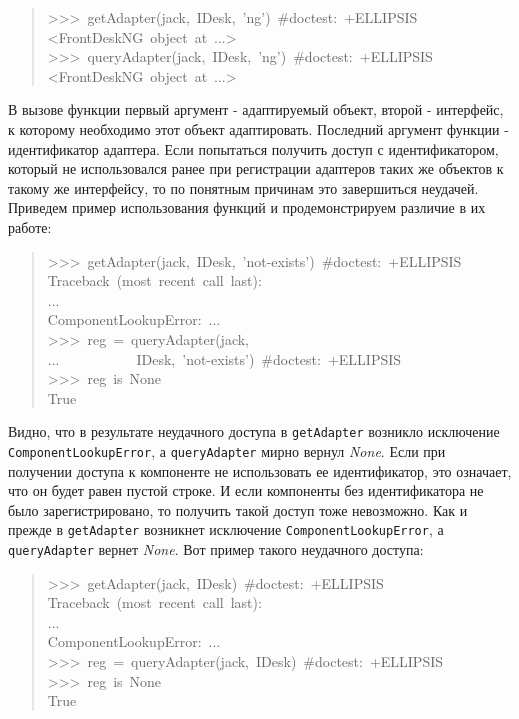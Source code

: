 \documentclass[a4paper,openany,twoside,final]{book}
\providecommand*{\DUroletitlereference}[1]{\textsl{#1}}
\begin{document}
\begin{quote}{\ttfamily \raggedright \noindent
>{}>{}>~getAdapter(jack,~IDesk,~'ng')~\#doctest:~+ELLIPSIS\\
<FrontDeskNG~object~at~...>\\
>{}>{}>~queryAdapter(jack,~IDesk,~'ng')~\#doctest:~+ELLIPSIS\\
<FrontDeskNG~object~at~...>
}
\end{quote}

В вызове функции первый аргумент - адаптируемый объект, второй -
интерфейс, к которому необходимо этот объект адаптировать.  Последний
аргумент функции - идентификатор адаптера.  Если попытаться получить
доступ с идентификатором, который не использовался ранее при
регистрации адаптеров таких же объектов к такому же интерфейсу, то по
понятным причинам это завершиться неудачей.  Приведем пример использования
функций и продемонстрируем различие в их работе:

\begin{quote}{\ttfamily \raggedright \noindent
>{}>{}>~getAdapter(jack,~IDesk,~'not-exists')~\#doctest:~+ELLIPSIS\\
Traceback~(most~recent~call~last):\\
...\\
ComponentLookupError:~...\\
>{}>{}>~reg~=~queryAdapter(jack,\\
...~~~~~~~~~~~IDesk,~'not-exists')~\#doctest:~+ELLIPSIS\\
>{}>{}>~reg~is~None\\
True
}
\end{quote}

Видно, что в результате неудачного доступа в \texttt{getAdapter} возникло
исключение \texttt{ComponentLookupError}, а \texttt{queryAdapter} мирно вернул
\DUroletitlereference{None}.  Если при получении доступа к компоненте не использовать ее
идентификатор, это означает, что он будет равен пустой строке.  И если
компоненты без идентификатора не было зарегистрировано, то получить
такой доступ тоже невозможно.  Как и прежде в \texttt{getAdapter} возникнет
исключение \texttt{ComponentLookupError}, а \texttt{queryAdapter} вернет
\DUroletitlereference{None}.  Вот пример такого неудачного доступа:

\begin{quote}{\ttfamily \raggedright \noindent
>{}>{}>~getAdapter(jack,~IDesk)~\#doctest:~+ELLIPSIS\\
Traceback~(most~recent~call~last):\\
...\\
ComponentLookupError:~...\\
>{}>{}>~reg~=~queryAdapter(jack,~IDesk)~\#doctest:~+ELLIPSIS\\
>{}>{}>~reg~is~None\\
True
}
\end{quote}
\end{document}
